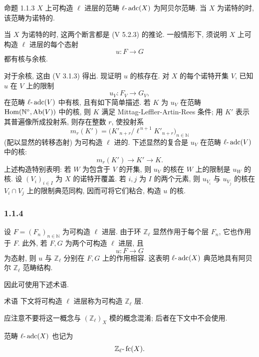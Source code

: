 \begin{statement}{命题 1.1.3}
\(X\) 上可构造 \(\ell\) 进层的范畴 \(\ell\text{-}\operatorname{adc}(X)\) 为阿贝尔范畴. 当 \(X\) 为诺特的时, 该范畴为诺特的.
\end{statement}

\begin{prooftext}[证明]
当 \(X\) 为诺特的时, 这两个断言都是 (V 5.2.3) 的推论. 一般情形下, 须说明 \(X\) 上可构造 \(\ell\) 进层的每个态射
\[
u:F\longrightarrow G
\]
都有核与余核.

对于余核, 这由 (V 3.1.3) 得出. 现证明 \(u\) 的核存在. 对 \(X\) 的每个诺特开集 \(V\), 已知 \(u\) 在 \(V\) 上的限制
\[
u_V:F_V\longrightarrow G_V,
\]
在范畴 \(\ell\text{-}\operatorname{adc}(V)\) 中有核, 且有如下简单描述. 若 \(K\) 为 \(u_V\) 在范畴 \(\operatorname{Hom}(\mathbb N^\circ,\operatorname{Ab}(V))\) 中的核, 则 \(K\) 满足 Mittag-Leffler-Artin-Rees 条件; 用 \(K'\) 表示其普遍像所成投射系, 则存在整数 \(r\), 使投射系
\[
m_r(K')=\bigl(K'_{n+r}/\ell^{\,n+1}K'_{n+r}\bigr)_{n\in\mathbb N}
\]
(配以显然的转移态射) 为可构造 \(\ell\) 进的. 下述显然的复合是 \(u_V\) 在范畴 \(\ell\text{-}\operatorname{adc}(V)\) 中的核:
\[
m_r(K')\longrightarrow K'\longrightarrow K.
\]
上述构造特别表明: 若 \(W\) 为包含于 \(V\) 的开集, 则 \(u_V\) 的核在 \(W\) 上的限制是 \(u_W\) 的核. 设 \((V_i)_{i\in I}\) 为 \(X\) 的诺特开覆盖. 若 \(i,j\) 为 \(I\) 的两个元素, 则 \(u_{V_i}\) 与 \(u_{V_j}\) 的核在 \(V_i\cap V_j\) 上的限制典范同构, 因而可将它们粘合, 构造 \(u\) 的核.
\end{prooftext}

\subsubsection*{1.1.4}
设 \(F=(F_n)_{n\in\mathbb N}\) 为可构造 \(\ell\) 进层. 由于环 \(\mathbb Z_\ell\) 显然作用于每个层 \(F_n\), 它也作用于 \(F\). 此外, 若 \(F,G\) 为两个可构造 \(\ell\) 进层, 且
\[
u:F\longrightarrow G
\]
为态射, 则 \(u\) 与 \(\mathbb Z_\ell\) 分别在 \(F,G\) 上的作用相容. 这表明 \(\ell\text{-}\operatorname{adc}(X)\) 典范地具有阿贝尔 \(\mathbb Z_\ell\) 范畴结构.

因此可使用下述术语.

\begin{statement}{术语}
下文将可构造 \(\ell\) 进层称为可构造 \(\mathbb Z_\ell\) 层.
\end{statement}

应注意不要将这一概念与 \((\mathbb Z_\ell)_X\) 模的概念混淆; 后者在下文中不会使用.

范畴 \(\ell\text{-}\operatorname{adc}(X)\) 也记为
\[
\mathbb Z_\ell\text{-}\operatorname{fc}(X).
\]

